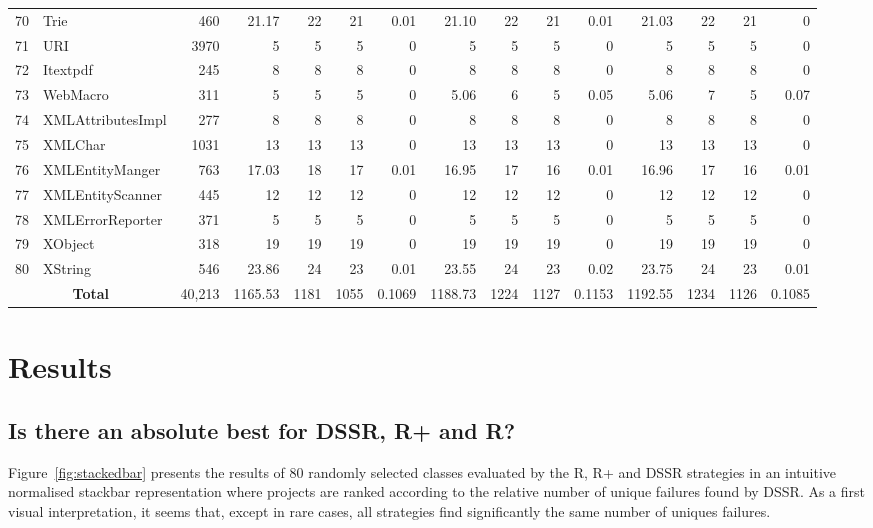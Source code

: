 \documentclass{acm_proc_article-sp}
\begin{document}
\begin{table} [htp!]
{\begin{tabularx}{1.2 \textwidth}{r l r r r r r r r r r r r r r}
 70						& Trie						&460	& 21.17&	22	&	21	& 		0.01					& 21.10	&  22		& 21		& 		0.01			& 21.03		& 22			& 21			&	0\\      
 71						& URI						&3970	& 5 	&	5	&	5	& 		0					& 5		&  5		& 5		& 		0			& 5			& 5			& 5			&	0\\      
 72						& Itextpdf						&245	& 8	&	8	&	8	& 		0					& 8		&  8		& 8		& 		0			& 8			& 8			& 8			&	0\\      
 73						& WebMacro					&311	& 5	&	5	&	5	& 		0					& 5.06	&  6		& 5		& 		0.05			& 5.06		& 7			& 5			&	0.07\\      
 74						& XMLAttributesImpl				&277	& 8	&	8	&	8	& 		0					& 8		&  8		& 8		& 		0			& 8			& 8			& 8			&	0\\      
 75						& XMLChar					&1031	& 13	&	13	&	13	& 		0					& 13		&  13		& 13		& 		0			& 13			& 13			& 13			&	0\\      
 76						& XMLEntityManger				&763	& 17.03&	18	&	17	& 		0.01					& 16.95	&  17		& 16		& 		0.01			& 16.96		& 17			& 16			&	0.01\\      
 77						& XMLEntityScanner				&445	& 12	&	12	&	12	& 		0					& 12		&  12		& 12		& 		0			& 12			& 12			& 12			&	0\\      
 78						& XMLErrorReporter				&371	& 5	&	5	&	5	& 		0					& 5		&  5		& 5		& 		0			& 5			& 5			& 5			&	0\\      
 79						& XObject						&318	& 19	&	19	&	19	& 		0					& 19		&  19		& 19		& 		0			& 19			& 19			& 19			&	0\\      
 80						& XString						&546	& 23.86&	24	&	23	& 		0.01					& 23.55	&  24		& 23		& 		0.02			& 23.75		& 24			& 23			&	0.01\\      
    						\multicolumn{2}{c}{\textbf{Total}}		&	40,213			&1165.53	& 1181	&    1055	&		0.1069					& 1188.73		&	1224	&	1127	&	0.1153			& 1192.55		& 1234		& 1126		& 	0.1085\\
     \end{tabularx} }
    \bigskip
    \label{table:Results}
\end{table}

\section{Results}\label{sec:res}




\subsection{Is there an absolute best for DSSR, R+ and R?}
Figure~\ref{fig:stackedbar} presents the results of 80 randomly selected classes evaluated by the R, R+ and DSSR strategies in an intuitive normalised stackbar representation where projects are ranked according to the relative number of unique failures found by DSSR. As a first visual interpretation, it seems that, except in rare cases, all strategies find significantly the same number of uniques failures.
\end{document}
